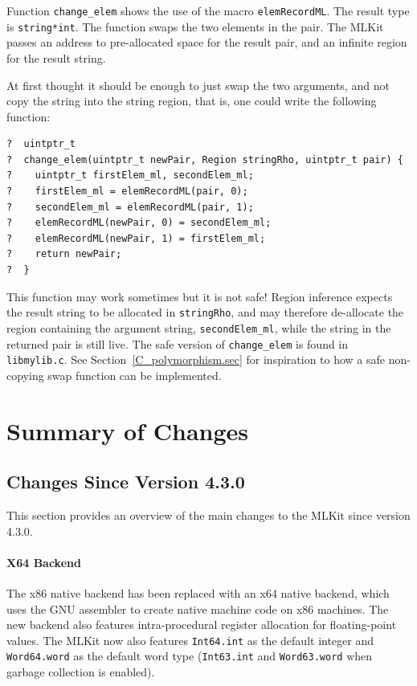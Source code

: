 \documentclass[12pt]{book}
\begin{document}
\begin{example}\label{change_elem.ex}
  Function \texttt{change\_elem} shows the use of
  the macro \texttt{elemRecordML}. The result type is \texttt{string*int}. The
  function swaps the two elements in the pair. The MLKit passes an address to
  pre-allocated space for the result pair, and an infinite region for the
  result string.

  At first thought it should be enough to just swap the two arguments, and
  not copy the string into the string region, that is, one could write the
  following function:
\begin{verbatim}
?  uintptr_t
?  change_elem(uintptr_t newPair, Region stringRho, uintptr_t pair) {
?    uintptr_t firstElem_ml, secondElem_ml;
?    firstElem_ml = elemRecordML(pair, 0);
?    secondElem_ml = elemRecordML(pair, 1);
?    elemRecordML(newPair, 0) = secondElem_ml;
?    elemRecordML(newPair, 1) = firstElem_ml;
?    return newPair;
?  }
\end{verbatim}
  This function may work sometimes but it is not safe! Region
  inference expects the result string to be allocated in
  \texttt{stringRho}, and may therefore de-allocate the region
  containing the argument string, \verb|secondElem_ml|, while the
  string in the returned pair is still live. The safe version of
  \verb|change_elem| is found in \verb|libmylib.c|. See
  Section~\ref{C_polymorphism.sec} for inspiration to how a safe
  non-copying swap function can be implemented.
\end{example}


\chapter{Summary of Changes}

\section{Changes Since Version 4.3.0}
%
This section provides an overview of the main changes to the MLKit
since version 4.3.0.

\subsubsection*{X64 Backend}
The
%
%
%
x86 native backend has been replaced with an
%
%
%
x64 native backend, which uses the GNU assembler to create native
machine code on x86 machines. The new backend also features
intra-procedural register allocation for floating-point values. The
MLKit now also features \texttt{Int64.int} as the default integer and
\texttt{Word64.word} as the default word type (\texttt{Int63.int} and
\texttt{Word63.word} when garbage collection is enabled).
\end{document}
